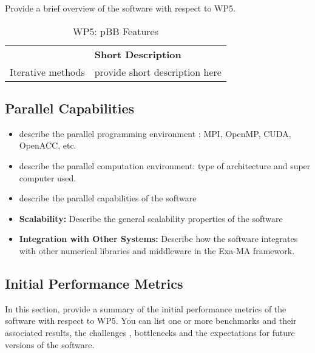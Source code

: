 Provide a brief overview of the software with respect to WP5.

\begin{table}[h!]
    \centering
    { 
        \setlength{\parindent}{0pt}
        \def\arraystretch{1.25}
        {
            \fontsize{9}{11}\selectfont
            \begin{tabular}{!{\color{numpexgray}\vrule}p{.25\linewidth}!{\color{numpexgray}\vrule}p{.6885\linewidth}!{\color{numpexgray}\vrule}}
    
     &  {\rule{0pt}{2.5ex}\color{white}\bf Short Description }\\ 
    
    Iterative methods & provide short description here \\
\end{tabular}
        }
    }
    \caption{WP5: pBB Features}
\end{table}


\subsection{Parallel Capabilities}
\label{sec:WP5:pBB:performances}


\begin{itemize}
    \item describe the parallel programming  environment : MPI, OpenMP, CUDA, OpenACC, etc.
    \item describe the parallel computation environment: type of architecture and super computer used.
    \item describe the parallel capabilities of the software
    \item \textbf{Scalability:} Describe the general scalability properties of the software
    \item \textbf{Integration with Other Systems:} Describe how the software integrates with other numerical libraries and middleware in the Exa-MA framework.
\end{itemize}

\subsection{Initial Performance Metrics}
\label{sec:WP5:pBB:metrics}

In this section, provide a summary of the initial performance metrics of the software with respect to WP5.
You can list one or more benchmarks and their associated results, the challenges , bottlenecks and the expectations for future versions of the software.



